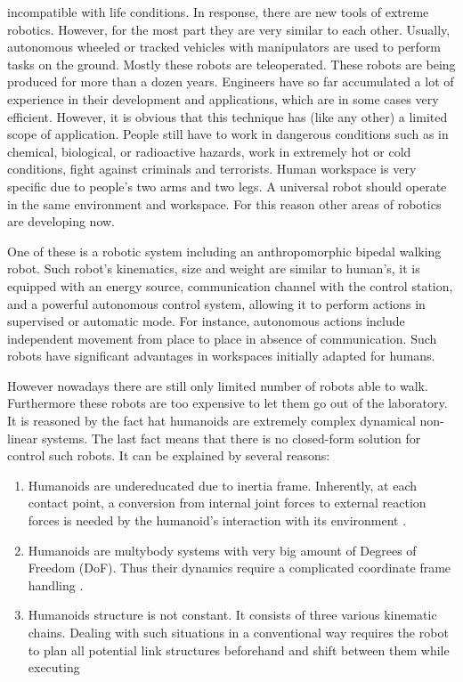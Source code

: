 \documentclass[12pt,a4paper]{report}
\begin{document}
incompatible with life conditions. In response, there are new tools of extreme robotics. However, for the most part they are very similar to each other. Usually, autonomous wheeled or tracked vehicles with manipulators are used to perform tasks on the ground. Mostly these robots are teleoperated. These robots are being produced for more than a dozen years. Engineers have so far accumulated a lot of experience in their development and applications, which are in some cases very efficient. However, it is obvious that this technique has (like any other) a limited scope of application. People still have to work in dangerous conditions such as in chemical, biological, or radioactive hazards, work in extremely hot or cold conditions, fight against criminals and terrorists.
		Human workspace is very specific due to people's two arms and two legs. A universal robot should operate in the same environment and workspace. For this reason other areas of robotics are developing now.
		
		One of these is a robotic system including an anthropomorphic bipedal walking robot. Such robot's kinematics, size and weight are similar to human's, it is equipped with an energy source, communication channel with the control station, and a powerful autonomous control system, allowing it to perform actions in supervised or automatic mode. For instance, autonomous actions include independent movement from place to place in absence of communication. Such robots have significant advantages in workspaces initially adapted for humans.
		
		However nowadays there are still only limited number of robots able to walk. Furthermore these robots are too expensive to let them go out of the laboratory. It is reasoned by the fact hat humanoids are extremely complex dynamical non-linear systems. The last fact means that there is no closed-form solution for control such robots. It can be explained by several reasons: 
		
		\begin{enumerate}
			\item Humanoids are undereducated due to inertia frame. Inherently, at each contact point, a conversion from internal joint forces to external reaction forces is needed by the humanoid’s interaction with its environment \cite{sugihara2005fast}.
			\item Humanoids are multybody systems with very big amount of Degrees of Freedom (DoF). Thus their dynamics require a complicated coordinate frame handling \cite{sugihara2005fast}. 
			\item Humanoids structure is not constant. It consists of three various kinematic chains. Dealing with such situations in a conventional way requires the robot to plan all potential link structures beforehand and shift between them while executing \cite{.sugihara2005fast}
		\end{enumerate}
		
\end{document}
